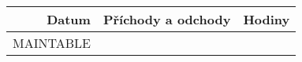 \documentclass[10pt, a4paper]{article}%
\begin{document}
\begin{table}[ht!]
    \centering
        \begin{tabularx}{\textwidth}{|d|X|h}
        \hline

        \textbf{Datum}         & \textbf{Příchody a odchody}       & \textbf{Hodiny} \\ \hline
        MAINTABLE

\end{tabularx}
\end{table}
\end{document}
